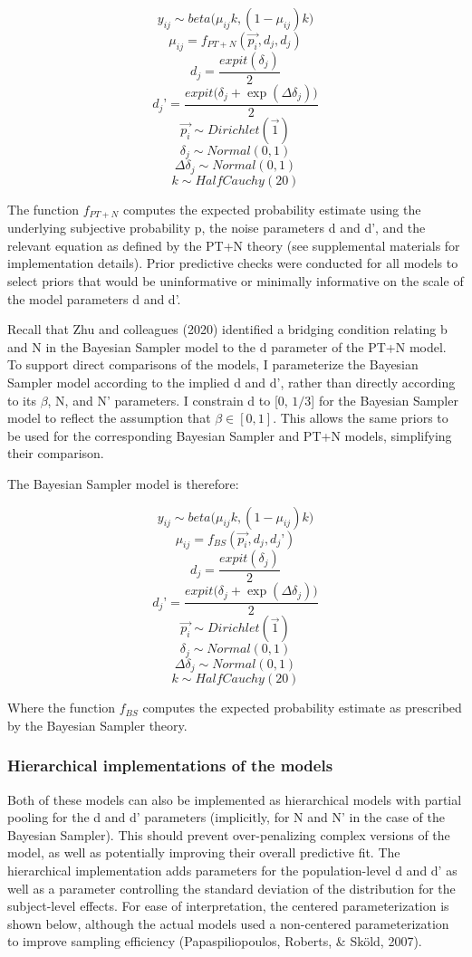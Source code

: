 \documentclass[
  english,
  man,floatsintext]{apa6}
\begin{document}
\[y_{ij} \sim beta\big(\mu_{ij} k, (1-\mu_{ij})k\big)\]
\[\mu_{ij} = f_{PT+N}(\overrightarrow{p_i}, d_j, d_j) \]
\[ d_j = \frac{expit(\delta_j)}{2}\]
\[ d_j’ = \frac{expit\big(\delta_j + \exp(\Delta\delta_j)\big)}{2}\]
\[ \overrightarrow{p_i} \sim Dirichlet(\overrightarrow{1})\]
\[ \delta_j \sim Normal(0,1)\]
\[ \Delta\delta_j \sim Normal(0,1)\]
\[ k \sim HalfCauchy(20)\]

The function \(f_{PT+N}\) computes the expected probability estimate using the underlying subjective probability p, the noise parameters d and d', and the relevant equation as defined by the PT+N theory (see supplemental materials for implementation details). Prior predictive checks were conducted for all models to select priors that would be uninformative or minimally informative on the scale of the model parameters d and d'.

Recall that Zhu and colleagues (2020) identified a bridging condition relating b and N in the Bayesian Sampler model to the d parameter of the PT+N model. To support direct comparisons of the models, I parameterize the Bayesian Sampler model according to the implied d and d', rather than directly according to its \(\beta\), N, and N' parameters. I constrain d to {[}0, \(1/3\){]} for the Bayesian Sampler model to reflect the assumption that \(\beta \in [0, 1]\). This allows the same priors to be used for the corresponding Bayesian Sampler and PT+N models, simplifying their comparison.

The Bayesian Sampler model is therefore:

\[y_{ij} \sim beta\big(\mu_{ij} k, (1-\mu_{ij})k\big)\]
\[\mu_{ij} = f_{BS}(\overrightarrow{p_i}, d_j, d_j’) \]
\[ d_j = \frac{expit(\delta_j)}{2}\]
\[ d_j’ = \frac{expit\big(\delta_j + \exp(\Delta\delta_j)\big)}{2}\]
\[ \overrightarrow{p_i} \sim Dirichlet(\overrightarrow{1})\]
\[ \delta_j \sim Normal(0,1)\]
\[ \Delta\delta_j \sim Normal(0,1)\]
\[ k \sim HalfCauchy(20)\]

Where the function \(f_{BS}\) computes the expected probability estimate as prescribed by the Bayesian Sampler theory.

\hypertarget{hierarchical-implementations-of-the-models}{%
\subsubsection{Hierarchical implementations of the models}\label{hierarchical-implementations-of-the-models}}

Both of these models can also be implemented as hierarchical models with partial pooling for the d and d' parameters (implicitly, for N and N' in the case of the Bayesian Sampler). This should prevent over-penalizing complex versions of the model, as well as potentially improving their overall predictive fit. The hierarchical implementation adds parameters for the population-level d and d' as well as a parameter controlling the standard deviation of the distribution for the subject-level effects. For ease of interpretation, the centered parameterization is shown below, although the actual models used a non-centered parameterization to improve sampling efficiency (Papaspiliopoulos, Roberts, \& Sköld, 2007).
\end{document}
